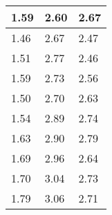 \begin{tabular}{|l|l|l|}
\hline
1.59&2.60&2.67\\\hline
1.46&2.67&2.47\\\hline
1.51&2.77&2.46\\\hline
1.59&2.73&2.56\\\hline
1.50&2.70&2.63\\\hline
1.54&2.89&2.74\\\hline
1.63&2.90&2.79\\\hline
1.69&2.96&2.64\\\hline
1.70&3.04&2.73\\\hline
1.79&3.06&2.71\\\hline
\end{tabular}
